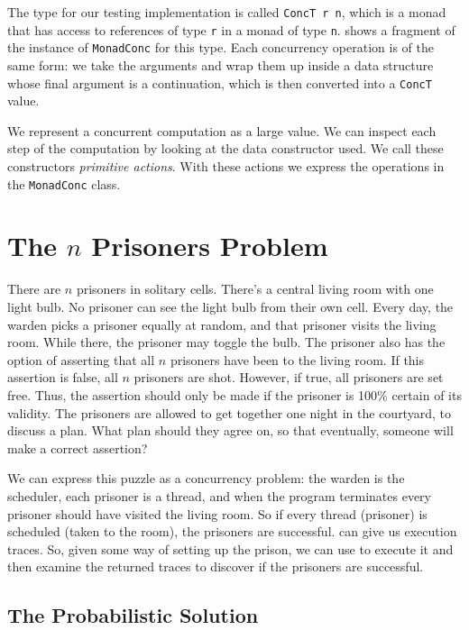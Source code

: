 The type for our testing implementation is called \verb|ConcT r n|,
which is a monad that has access to references of type \verb|r| in a
monad of type \verb|n|.   shows a fragment of the
instance of \verb|MonadConc| for this type.  Each concurrency
operation is of the same form: we take the arguments and wrap them up
inside a data structure whose final argument is a continuation, which
is then converted into a \verb|ConcT| value.

We represent a concurrent computation as a large value.  We can
inspect each step of the computation by looking at the data
constructor used.  We call these constructors \emph{primitive
  actions}.  With these actions we express the operations in the
\verb|MonadConc| class.

\section{The $n$ Prisoners Problem}
\label{sec:dejafu-100}

\begin{displayquote}
  There are $n$ prisoners in solitary cells.  There's a central living
  room with one light bulb.  No prisoner can see the light bulb from
  their own cell.  Every day, the warden picks a prisoner equally at
  random, and that prisoner visits the living room.  While there, the
  prisoner may toggle the bulb.  The prisoner also has the option of
  asserting that all $n$ prisoners have been to the living room.  If
  this assertion is false, all $n$ prisoners are shot.  However, if
  true, all prisoners are set free.  Thus, the assertion should only
  be made if the prisoner is 100\% certain of its validity.  The
  prisoners are allowed to get together one night in the courtyard, to
  discuss a plan.  What plan should they agree on, so that eventually,
  someone will make a correct assertion?
\end{displayquote}

We can express this puzzle as a concurrency problem: the warden is the
scheduler, each prisoner is a thread, and when the program terminates
every prisoner should have visited the living room.  So if every
thread (prisoner) is scheduled (taken to the room), the prisoners are
successful.  \dejafu{} can give us execution traces.  So, given some
way of setting up the prison, we can use \dejafu{} to execute it and
then examine the returned traces to discover if the prisoners are
successful.

\subsection{The Probabilistic Solution}

